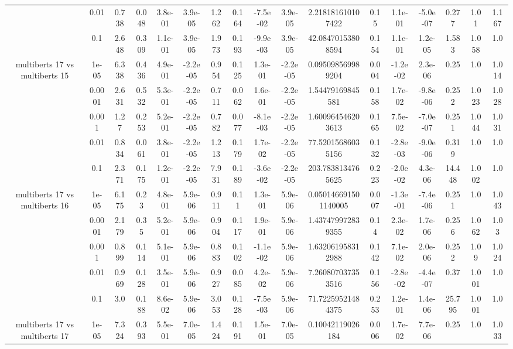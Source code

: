 \begin{tabular}{|c|c|c|c|c|c|c|c|c|c|c|c|c|c|c|c|c|}
 & 0.01 & 0.738 & 0.048 & 3.8e-01 & 3.9e-05 & 1.262 & 0.164 & -7.5e-02 & 3.9e-05 & 2.218181610107422 & 0.15 & 1.1e-01 & -5.0e-07 & 0.277 & 1.01 & 1.167 \\
 & 0.1 & 2.648 & 0.309 & 1.1e-01 & 3.9e-05 & 1.973 & 0.193 & -9.9e-03 & 3.9e-05 & 42.08470153808594 & 0.154 & 1.1e-01 & 1.2e-05 & 1.583 & 1.058 & 1.0 \\
\hline
\multirow{5}{*}{multiberts 17 vs multiberts 15} & 1e-05 & 6.338 & 0.436 & 4.9e-01 & -2.2e-05 & 0.954 & 0.125 & 1.3e-01 & -2.2e-05 & 0.095098569989204 & 0.004 & -1.2e-02 & 2.3e-06 & 0.25 & 1.0 & 1.014 \\
 & 0.0001 & 2.631 & 0.532 & 5.3e-01 & -2.2e-05 & 0.711 & 0.062 & 1.6e-01 & -2.2e-05 & 1.54479169845581 & 0.158 & 1.7e-02 & -9.8e-06 & 0.252 & 1.023 & 1.028 \\
 & 0.001 & 1.27 & 0.253 & 5.2e-01 & -2.2e-05 & 0.782 & 0.077 & -8.1e-03 & -2.2e-05 & 1.600964546203613 & 0.165 & 7.5e-02 & -7.0e-07 & 0.251 & 1.044 & 1.031 \\
 & 0.01 & 0.834 & 0.061 & 3.8e-01 & -2.2e-05 & 1.213 & 0.179 & 1.7e-02 & -2.2e-05 & 77.52015686035156 & 0.132 & -2.8e-03 & -9.0e-06 & 0.319 & 1.0 & 1.0 \\
 & 0.1 & 2.371 & 0.175 & 1.2e-01 & -2.2e-05 & 7.931 & 0.189 & -3.6e-02 & -2.2e-05 & 203.7838134765625 & 0.223 & -2.0e-02 & 4.3e-06 & 14.448 & 1.002 & 1.0 \\
\hline
\multirow{5}{*}{multiberts 17 vs multiberts 16} & 1e-05 & 6.175 & 0.23 & 4.8e-01 & 5.9e-06 & 0.911 & 0.11 & 1.3e-01 & 5.9e-06 & 0.050146691501140005 & 0.007 & -1.3e-01 & -7.4e-06 & 0.251 & 1.0 & 1.043 \\
 & 0.0001 & 2.179 & 0.35 & 5.2e-01 & 5.9e-06 & 0.904 & 0.117 & 1.9e-01 & 5.9e-06 & 1.437479972839355 & 0.14 & 2.3e-02 & 1.7e-06 & 0.256 & 1.062 & 1.03 \\
 & 0.001 & 0.899 & 0.114 & 5.1e-01 & 5.9e-06 & 0.883 & 0.102 & -1.1e-02 & 5.9e-06 & 1.632061958312988 & 0.142 & 7.1e-02 & 2.0e-06 & 0.252 & 1.09 & 1.024 \\
 & 0.01 & 0.969 & 0.128 & 3.5e-01 & 5.9e-06 & 0.927 & 0.085 & 4.2e-02 & 5.9e-06 & 7.260807037353516 & 0.156 & -2.8e-02 & -4.4e-07 & 0.37 & 1.001 & 1.0 \\
 & 0.1 & 3.0 & 0.188 & 8.6e-02 & 5.9e-06 & 3.053 & 0.128 & -7.5e-03 & 5.9e-06 & 71.72259521484375 & 0.253 & 1.2e-01 & 1.4e-06 & 25.795 & 1.001 & 1.0 \\
\hline
\multirow{5}{*}{multiberts 17 vs multiberts 17} & 1e-05 & 7.324 & 0.393 & 5.5e-01 & 7.0e-05 & 1.424 & 0.191 & 1.5e-01 & 7.0e-05 & 0.10042119026184 & 0.006 & 1.7e-02 & 7.7e-06 & 0.25 & 1.0 & 1.033 \\

\end{tabular}

